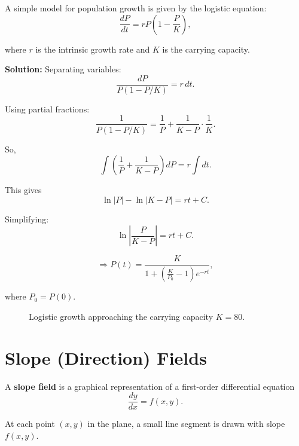 \begin{example}
A simple model for population growth is given by the logistic equation:
\[
\frac{dP}{dt} = rP \left(1 - \frac{P}{K}\right),
\]

where $r$ is the intrinsic growth rate and $K$ is the carrying capacity.

\textbf{Solution:}  
Separating variables:
\[
\frac{dP}{P(1 - P/K)} = r \, dt.
\]

Using partial fractions:
\[
\frac{1}{P(1 - P/K)} = \frac{1}{P} + \frac{1}{K-P} \cdot \frac{1}{K}.
\]

So,
\[
\int \left( \frac{1}{P} + \frac{1}{K-P} \right) dP = r \int dt.
\]

This gives
\[
\ln|P| - \ln|K-P| = rt + C.
\]

Simplifying:
\[
\ln\left|\frac{P}{K-P}\right| = rt + C.
\]


\[
\Rightarrow P(t) = \frac{K}{1 + \left(\frac{K}{P_0} - 1\right)e^{-rt}},
\]

where $P_0 = P(0)$.
\end{example}
\begin{figure}[h]
\centering
{}
\caption{Logistic growth approaching the carrying capacity $K=80$.}
\end{figure}


\section{Slope (Direction) Fields}
\begin{definition}
    A \textbf{slope field} is a graphical representation of a first-order differential equation
    \[
    \frac{dy}{dx} = f(x,y).
    \]
\end{definition}
At each point $(x,y)$ in the plane, a small line segment is drawn with slope $f(x,y)$.

